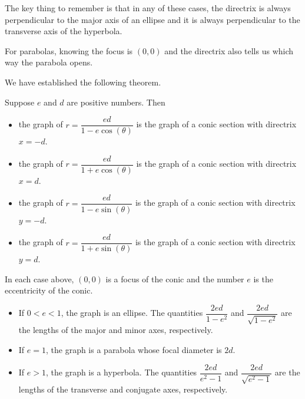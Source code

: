 \documentclass{ximera}
\begin{document}
{ The key thing to remember is that in any of these cases, the directrix is always perpendicular to the major axis of an ellipse and it is always perpendicular to the transverse axis of the hyperbola.
 
 \smallskip
 
  For parabolas, knowing the focus is $(0,0)$ and the directrix also tells us which way the parabola opens.  
 
 \smallskip
 
 We have established the following theorem.

\smallskip


\begin{theorem}  \label{polarformofconicsthm}  Suppose $e$ and $d$ are positive numbers.  Then

\begin{itemize}

\item  the graph of $r = \dfrac{ed}{1 - e\cos(\theta)}$ is the graph of a conic section with directrix $x = -d$.

\item  the graph of $r = \dfrac{ed}{1 + e\cos(\theta)}$ is the graph of a conic section with directrix $x = d$.

\item  the graph of $r = \dfrac{ed}{1 - e\sin(\theta)}$ is the graph of a conic section with directrix $y = -d$.

\item  the graph of $r = \dfrac{ed}{1 + e\sin(\theta)}$ is the graph of a conic section with directrix $y = d$.


\end{itemize}

In each case above, $(0,0)$ is a focus of the conic and the number $e$ is the eccentricity of the conic. 

\begin{itemize}

\item If $0 < e < 1$, the graph is an ellipse.   The quantities $\dfrac{2ed}{1-e^2}$ and  $\dfrac{2ed}{\sqrt{1-e^2}}$ are the lengths of the major and minor axes, respectively.

\item If $e = 1$, the graph is a parabola whose focal diameter is $2d$.

\item If $e > 1$, the graph is a hyperbola.  The quantities    $\dfrac{2ed}{e^2-1}$ and $\dfrac{2ed}{\sqrt{e^2-1}}$ are the lengths of the transverse and conjugate axes, respectively.


\end{itemize}
\end{theorem}}
\end{document}
